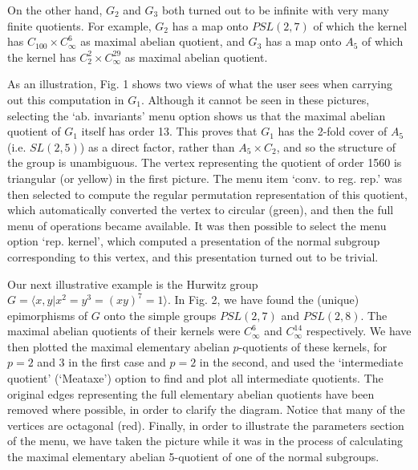 On the other
hand, $G_2$ and $G_3$ both turned out to be infinite with very many finite
quotients. For example, $G_2$ has
a map onto $PSL(2,7)$ of which the kernel has $C_{100} \times C_\infty^6$ as
maximal abelian quotient, and $G_3$ has a map onto $A_5$  of which the kernel
has $C_2^2 \times C_\infty^{29}$ as maximal abelian quotient.

As an illustration, Fig. 1 shows two views of what the user sees when
carrying out this computation in $G_1$. Although it cannot be seen in these
pictures, selecting the `ab. invariants' menu option shows us that the maximal
abelian quotient of $G_1$ itself has order 13. This proves that $G_1$ has
the 2-fold cover of $A_5$ (i.e. $SL(2,5)$) as a direct factor, rather than
$A_5 \times C_2$, and so the structure of the group is unambiguous. The
vertex representing the quotient of order 1560 is triangular (or yellow) in
the first picture. The menu item `conv. to reg. rep.' was then selected to
compute the regular permutation representation of this quotient, which
automatically converted the vertex to circular (green), and then the full
menu of operations became available. It was then possible to select the
menu option `rep. kernel', which computed a presentation of the normal
subgroup corresponding to this vertex, and this presentation turned out to be
trivial.

\topinsert
{}
\vskip 67mm
 \endcaption
\endinsert

Our next illustrative example is the Hurwitz group
$G = \langle x,y | x^2=y^3=(xy)^7=1 \rangle$.
In Fig. 2, we have found the (unique) epimorphisms of $G$
onto the simple groups $PSL(2,7)$ and $PSL(2,8)$. The maximal abelian quotients
of their kernels were $C_\infty^6$ and $C_\infty^{14}$ respectively. We
have then plotted the maximal elementary abelian  $p$-quotients of these
kernels, for $p=2$ and 3 in the first case and $p=2$ in the second, and used
the `intermediate quotient' (`Meataxe') option to find and plot
all intermediate quotients. The original edges representing the full
elementary abelian quotients have been removed where possible, in order
to clarify the diagram. Notice that many of the vertices are octagonal (red).
Finally, in order to illustrate the parameters
section of the menu, we have taken the picture while it was in the process
of calculating the maximal elementary abelian 5-quotient of one of the
normal subgroups.

\topinsert
{}
\vskip 115mm
 \endcaption
\endinsert

